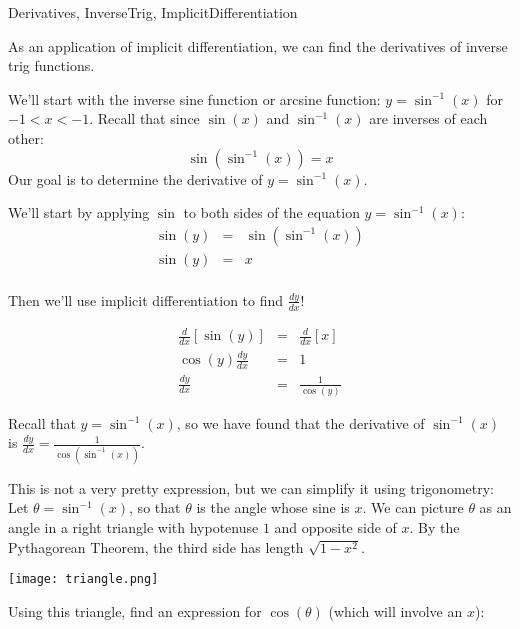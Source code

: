 \begin{tagblock}{Derivatives, InverseTrig, ImplicitDifferentiation}
\begin{question}
	


As an application of implicit differentiation, we can find the derivatives of inverse trig functions.


\bigskip

  We'll start with the inverse sine function or arcsine function:  $y=\sin^{-1}(x)$ for $-1<x<-1$.  Recall that since $\sin(x)$ and $\sin^{-1}(x)$ are inverses of each other: 
\[\sin(\sin^{-1}(x)) = x\]
Our goal is to determine the derivative of $y=\sin^{-1}(x)$.  

\bigskip
We'll start by applying $\sin$ to both sides of the equation $y=\sin^{-1}(x)$:
\begin{eqnarray*} \sin(y) &= &\sin(\sin ^{-1}(x)) \\
 \sin(y) &= & x \\
 \end{eqnarray*}
 
 Then we'll use implicit differentiation to find $\frac{dy}{dx}$!
 

 \begin{eqnarray*}
  \frac{d}{dx} [\sin(y)] &= & \frac{d}{dx}[x] \\
  \cos(y) \frac{dy}{dx} & = & 1 \\
    \frac{dy}{dx} &=&  \frac{1}{\cos(y)}
 \end{eqnarray*}
 
 Recall that $y=\sin^{-1}(x)$, so we have found that the derivative of $\sin^{-1}(x)$ is $ \frac{dy}{dx} =  \frac{1}{\cos(\sin^{-1}(x))}$.  
 
\begin{minipage}{.7\textwidth}
This is not a very pretty expression, but we can simplify it using trigonometry:  Let $\theta = \sin^{-1}(x)$, so that $\theta$ is the angle whose sine is $x$.  We can picture $\theta$ as an angle in a right triangle with hypotenuse $1$ and opposite side of $x$.  By the Pythagorean Theorem, the third side has length $\sqrt{1-x^2}$.
\end{minipage}%
\begin{minipage}{.3\textwidth} 
\texttt{[image: triangle.png]}
\end{minipage}

Using this triangle, find an expression for $\cos(\theta)$ (which will involve an $x$):


\end{question}
\end{tagblock}
